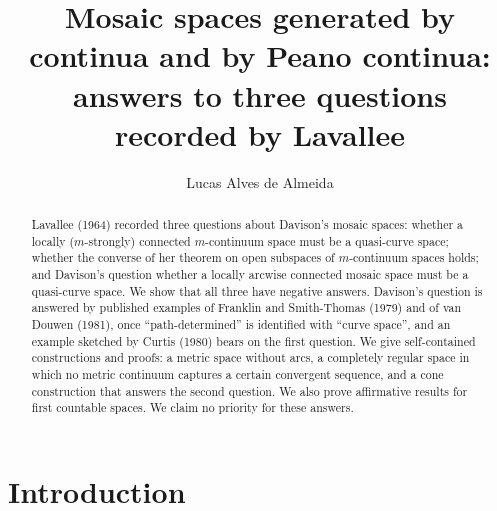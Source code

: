 \documentclass[11pt]{amsart}
\theoremstyle{definition}
\theoremstyle{remark}
\numberwithin{equation}{section}
\begin{document}
\title[Three questions on mosaic spaces]{Mosaic spaces generated by continua and by Peano continua: answers to three questions recorded by Lavallee}
\author{Lucas Alves de Almeida}

\begin{abstract}
Lavallee (1964) recorded three questions about Davison's mosaic spaces: whether a locally ($m$-strongly) connected $m$-continuum space must be a quasi-curve space; whether the converse of her theorem on open subspaces of $m$-continuum spaces holds; and Davison's question whether a locally arcwise connected mosaic space must be a quasi-curve space. We show that all three have negative answers. Davison's question is answered by published examples of Franklin and Smith-Thomas (1979) and of van Douwen (1981), once ``path-determined'' is identified with ``curve space'', and an example sketched by Curtis (1980) bears on the first question. We give self-contained constructions and proofs: a metric space without arcs, a completely regular space in which no metric continuum captures a certain convergent sequence, and a cone construction that answers the second question. We also prove affirmative results for first countable spaces. We claim no priority for these answers.
\end{abstract}
\maketitle

\section{Introduction}\label{sec:intro}
\end{document}
